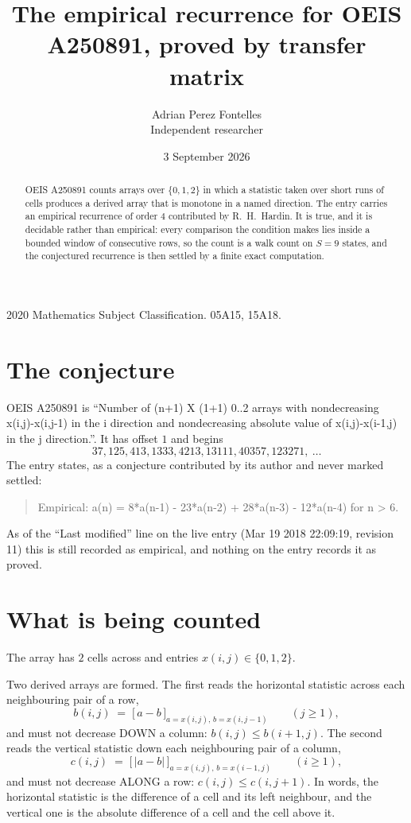 \documentclass[11pt,a4paper]{article}
\title{The empirical recurrence for OEIS A250891, proved by transfer matrix}
\author{Adrian Perez Fontelles\\ \small Independent researcher}
\date{3 September 2026}
\theoremstyle{plain}
\theoremstyle{definition}
\begin{document}
\maketitle

\begin{abstract}
OEIS A250891 counts arrays over $\{0,1,2\}$ in which a statistic taken over short runs
of cells produces a derived array that is monotone in a named direction. The entry carries an
empirical recurrence of order $4$ contributed by R.~H.~Hardin. It is true, and it is
decidable rather than empirical: every comparison the condition makes lies inside a bounded
window of consecutive rows, so the count is a walk count on $S=9$ states, and the
conjectured recurrence is then settled by a finite exact computation.
\end{abstract}

\noindent\small 2020 Mathematics Subject Classification. 05A15, 15A18.\normalsize

\section{The conjecture}

OEIS A250891 is ``Number of (n+1) X (1+1) 0..2 arrays with nondecreasing x(i,j)-x(i,j-1) in the i direction and nondecreasing absolute value of x(i,j)-x(i-1,j) in the j direction.''. It has offset $1$ and begins
\[
37, 125, 413, 1333, 4213, 13111, 40357, 123271,\ \dots
\]
The entry states, as a conjecture contributed by its author and never marked settled:
\begin{quote}
Empirical: a(n) = 8*a(n-1) - 23*a(n-2) + 28*a(n-3) - 12*a(n-4) for n > 6.
\end{quote}
As of the ``Last modified'' line on the live entry (Mar 19 2018 22:09:19, revision 11) this is still
recorded as empirical, and nothing on the entry records it as proved.

\section{What is being counted}

The array has $2$ cells across and entries $x(i,j)\in\{0,1,2\}$.

Two derived arrays are formed. The first reads the horizontal statistic across each
neighbouring pair of a row,
\[
b(i,j)\;=\;\bigl[\,a-b\,\bigr]_{a=x(i,j),\,b=x(i,j-1)}\qquad (j\ge1),
\]
and must not decrease DOWN a column: $b(i,j)\le b(i{+}1,j)$. The second reads the vertical
statistic down each neighbouring pair of a column,
\[
c(i,j)\;=\;\bigl[\,\lvert a-b\rvert\,\bigr]_{a=x(i,j),\,b=x(i{-}1,j)}\qquad (i\ge1),
\]
and must not decrease ALONG a row: $c(i,j)\le c(i,j{+}1)$. In words, the horizontal statistic
is the difference of a cell and its left neighbour, and the vertical one is
the absolute difference of a cell and the cell above it.
\end{document}
